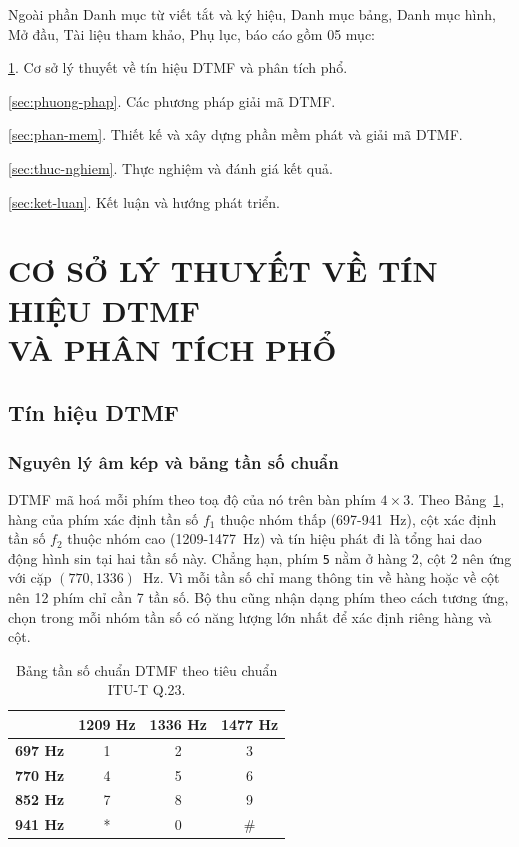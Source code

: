 \documentclass{dtmf_report}
\begin{document}

Ngoài phần Danh mục từ viết tắt và ký hiệu, Danh mục bảng, Danh mục hình, Mở
đầu, Tài liệu tham khảo, Phụ lục, báo cáo gồm 05 mục:

\ref{sec:ly-thuyet}. Cơ sở lý thuyết về tín hiệu DTMF và phân tích phổ.

\ref{sec:phuong-phap}. Các phương pháp giải mã DTMF.

\ref{sec:phan-mem}. Thiết kế và xây dựng phần mềm phát và giải mã DTMF.

\ref{sec:thuc-nghiem}. Thực nghiệm và đánh giá kết quả.

\ref{sec:ket-luan}. Kết luận và hướng phát triển.

\batsotrang

\section[CƠ SỞ LÝ THUYẾT VỀ TÍN HIỆU DTMF VÀ PHÂN TÍCH PHỔ]{CƠ SỞ LÝ THUYẾT VỀ TÍN HIỆU DTMF\\ VÀ PHÂN TÍCH PHỔ}
\label{sec:ly-thuyet}

\subsection{Tín hiệu DTMF}

\subsubsection{Nguyên lý âm kép và bảng tần số chuẩn}

DTMF mã hoá mỗi phím theo toạ độ của nó trên bàn phím $4 \times 3$. Theo
Bảng~\ref{tab:tanso}, hàng của phím xác định tần số $f_{1}$ thuộc nhóm thấp
(697-941~Hz), cột xác định tần số $f_{2}$ thuộc nhóm cao (1209-1477~Hz) và tín
hiệu phát đi là tổng hai dao động hình sin tại hai tần số này. Chẳng hạn, phím
\texttt{5} nằm ở hàng 2, cột 2 nên ứng với cặp $(770, 1336)$~Hz. Vì mỗi tần số
chỉ mang thông tin về hàng hoặc về cột nên 12 phím chỉ cần 7 tần số. Bộ thu cũng
nhận dạng phím theo cách tương ứng, chọn trong mỗi nhóm tần số có năng lượng lớn
nhất để xác định riêng hàng và cột.

\begin{table}[H]
\centering
\caption{Bảng tần số chuẩn DTMF theo tiêu chuẩn \mbox{ITU-T} Q.23.}
\label{tab:tanso}
\begin{tabular}{l c c c}
\toprule
& \textbf{1209 Hz} & \textbf{1336 Hz} & \textbf{1477 Hz} \\
\midrule
\textbf{697 Hz} & 1 & 2 & 3 \\
\textbf{770 Hz} & 4 & 5 & 6 \\
\textbf{852 Hz} & 7 & 8 & 9 \\
\textbf{941 Hz} & * & 0 & \# \\
\bottomrule
\end{tabular}
\end{table}
\end{document}
